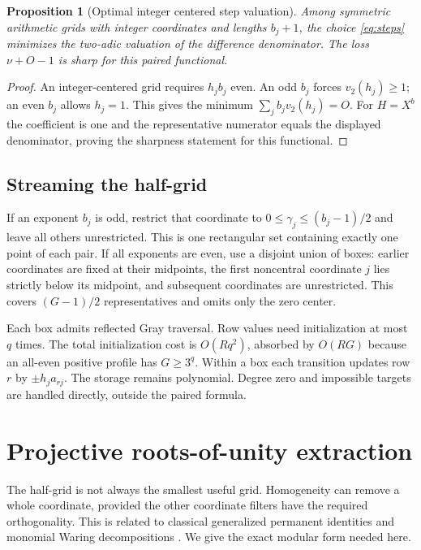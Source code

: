\documentclass[11pt,letterpaper]{article}
\newtheorem{proposition}[theorem]{Proposition}
\theoremstyle{definition}\newtheorem{definition}[theorem]{Definition}
\theoremstyle{remark}\newtheorem{remark}[theorem]{Remark}
\newcommand{\vv}{v_2}
\begin{document}
\begin{proposition}[Optimal integer centered step valuation]
Among symmetric arithmetic grids with integer coordinates and lengths
$b_j+1$, the choice \eqref{eq:steps} minimizes the two-adic valuation
of the difference denominator. The loss $\nu+O-1$ is sharp for this
paired functional.
\end{proposition}
\begin{proof}
An integer-centered grid requires $h_jb_j$ even. An odd $b_j$ forces
$\vv(h_j)\ge1$; an even $b_j$ allows $h_j=1$. This gives the minimum
$\sum_jb_j\vv(h_j)=O$. For $H=X^b$ the coefficient is one and the
representative numerator equals the displayed denominator, proving the
sharpness statement for this functional.
\end{proof}

\subsection{Streaming the half-grid}
If an exponent $b_j$ is odd, restrict that coordinate to
$0\le\gamma_j\le(b_j-1)/2$ and leave all others unrestricted. This is
one rectangular set containing exactly one point of each pair. If all
exponents are even, use a disjoint union of boxes: earlier coordinates
are fixed at their midpoints, the first noncentral coordinate $j$ lies
strictly below its midpoint, and subsequent coordinates are unrestricted.
This covers $(G-1)/2$ representatives and omits only the zero center.

Each box admits reflected Gray traversal. Row values need initialization
at most $q$ times. The total initialization cost is $O(Rq^2)$, absorbed
by $O(RG)$ because an all-even positive profile has $G\ge3^q$.
Within a box each transition updates row $r$ by
$\pm h_j a_{rj}$. The storage remains polynomial. Degree zero and
impossible targets are handled directly, outside the paired formula.

\section{Projective roots-of-unity extraction}
\label{sec:projective}
The half-grid is not always the smallest useful grid. Homogeneity can
remove a whole coordinate, provided the other coordinate filters have
the required orthogonality. This is related to classical generalized
permanent identities and monomial Waring decompositions
\cite{glynn,chin,ccg}. We give the exact modular form needed here.
\end{document}

